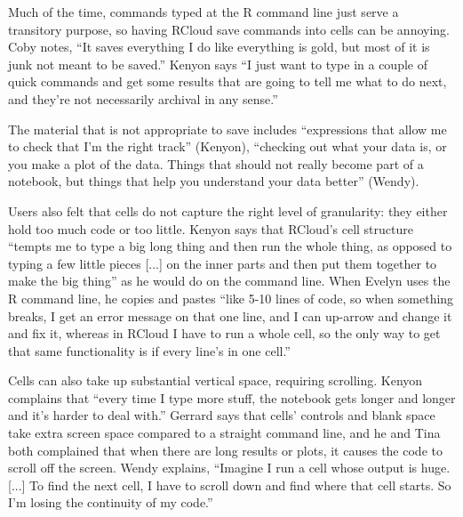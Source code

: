
Much of the time, commands typed at the R command line just serve a transitory
purpose, so having RCloud save commands into cells can be annoying. Coby notes, ``It saves everything I do like everything is gold, but most
of it is junk not meant to be saved.'' Kenyon says ``I just want to type in a
couple of quick commands and get some results that are going to tell
me what to do next, and they're not necessarily archival in any sense.''

The material that is not appropriate to save includes ``expressions that allow
me to check that I'm the right track'' (Kenyon), ``checking out what your data is,
or you make a plot of the data. Things that should not really become part of a
notebook, but things that help you understand your data better'' (Wendy).

Users also felt that cells do not capture the right level of granularity: they
either hold too much code or too little. Kenyon says that RCloud's cell structure
``tempts me to type a big long thing and then run the whole thing, as opposed to
typing a few little pieces [...] on the inner parts and then put
them together to make the big thing'' as he would do on the command line. When
Evelyn uses the R command line, he copies and pastes ``like 5-10 lines of code,
so when something breaks, I get an error message on that one line, and I can
up-arrow and change it and fix it, whereas in RCloud I have to run a whole cell,
so the only way to get that same functionality is if every line's in one
cell.''

Cells can also take up substantial vertical space, requiring scrolling. Kenyon
complains that ``every time I type more stuff, the notebook gets longer and
longer and it's harder to deal with.'' Gerrard says that cells' controls and blank
space take extra screen space compared to a straight command line, and he and
Tina both complained that when there are long results or plots, it causes the
code to scroll off the screen. Wendy explains, ``Imagine I run a cell whose
output is huge. [...] To find the next cell, I have to scroll down and find
where that cell starts. So I'm losing the continuity of my code.''

